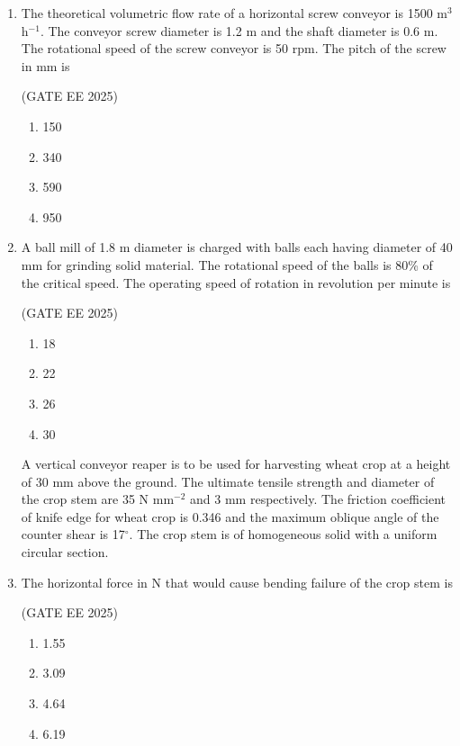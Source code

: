 \documentclass[journal,12pt,onecolumn]{IEEEtran}
\theoremstyle{remark}
\begin{document}
\begin{enumerate}
\item The theoretical volumetric flow rate of a horizontal screw conveyor is 1500 m$^{3}$ h$^{-1}$. The conveyor screw diameter is 1.2 m and the shaft diameter is 0.6 m. The rotational speed of the screw conveyor is 50 rpm. The pitch of the screw in mm is

\hfill(GATE EE 2025)

\begin{multicols}{4}
\begin{enumerate}
\item 150
\item 340
\item 590
\item 950
\end{enumerate}
\end{multicols}

\item A ball mill of 1.8 m diameter is charged with balls each having diameter of 40 mm for grinding solid material. The rotational speed of the balls is 80\% of the critical speed. The operating speed of rotation in revolution per minute is

\hfill(GATE EE 2025)

\begin{multicols}{4}
\begin{enumerate}
\item 18
\item 22
\item 26
\item 30
\end{enumerate}
\end{multicols}

A vertical conveyor reaper is to be used for harvesting wheat crop at a height of 30 mm above the ground. The ultimate tensile strength and diameter of the crop stem are 35 N mm$^{-2}$ and 3 mm respectively. The friction coefficient of knife edge for wheat crop is 0.346 and the maximum oblique angle of the counter shear is 17$^\circ$. The crop stem is of homogeneous solid with a uniform circular section.

\item The horizontal force in N that would cause bending failure of the crop stem is

\hfill(GATE EE 2025)

\begin{multicols}{4}
\begin{enumerate}
\item 1.55
\item 3.09
\item 4.64
\item 6.19
\end{enumerate}
\end{multicols}


\end{enumerate}
\end{document}
